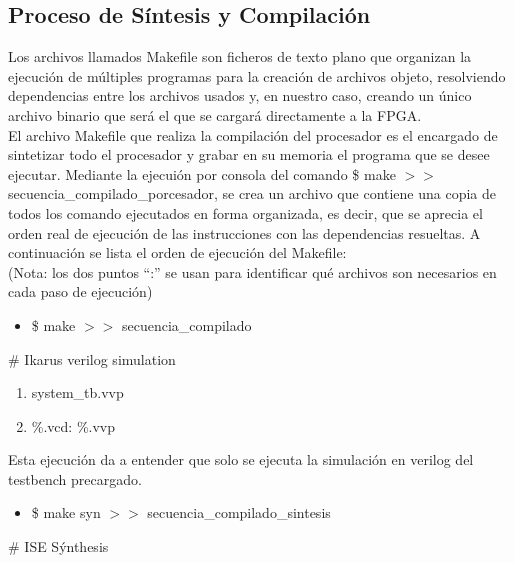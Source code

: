 \documentclass[twocolumn]{IEEEtran}
\begin{document}
\subsection{Proceso de Síntesis y Compilación}
\noindent
Los archivos llamados Makefile son ficheros de texto plano que organizan la ejecución de múltiples programas para la creación de archivos objeto, resolviendo dependencias entre los archivos usados y, en nuestro caso, creando un único archivo binario que será el que se cargará directamente a la FPGA.\\
El archivo Makefile que realiza la compilación del procesador es el encargado de sintetizar todo el procesador y grabar en su memoria el programa que se desee ejecutar. Mediante la ejecuión por consola del comando \$ make $>>$ secuencia\_compilado\_porcesador, se crea un archivo que contiene una copia de todos los comando ejecutados en forma organizada, es decir, que se aprecia el orden real de ejecución de las instrucciones con las dependencias resueltas. A continuación se lista el orden de ejecución del Makefile:\\
(Nota: los dos puntos ``:'' se usan para identificar qué archivos son necesarios en cada paso de ejecución)
\begin{itemize}
 \item \$ make $>>$ secuencia\_compilado
\end{itemize}
\noindent
\# Ikarus verilog simulation
\begin{enumerate}
 \item system\_tb.vvp
 \item \%.vcd: \%.vvp
\end{enumerate}
\noindent
Esta ejecución da a entender que solo se ejecuta la simulación en verilog del testbench precargado.
\begin{itemize}
 \item \$ make syn $>>$ secuencia\_compilado\_sintesis
\end{itemize}
\noindent
\# ISE Sýnthesis
\end{document}
